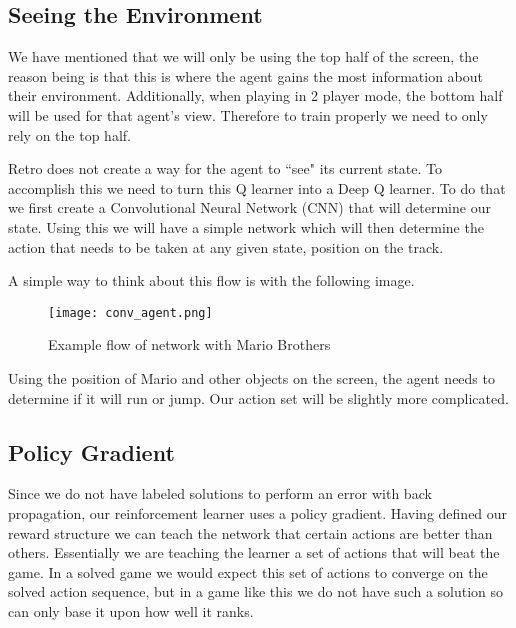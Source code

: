 \subsection{Seeing the Environment}
We have mentioned that we will only be using the top half of the screen, the
reason being is that this is where the agent gains the most information about
their environment. Additionally, when playing in 2 player mode, the bottom half
will be used for that agent's view. Therefore to train properly we need to only
rely on the top half. 

Retro does not create a way for the agent to ``see" its current state. To 
accomplish this we need to turn this Q learner into a Deep Q learner. To do that
we first create a Convolutional Neural Network (CNN) that will determine our
state. Using this we will have a simple network which will then determine the
action that needs to be taken at any given state, position on the track. 

A simple way to think about this flow is with the following image.
\begin{figure}[h]
    \centering
    \texttt{[image: conv\_agent.png]}
    \caption{Example flow of network with Mario Brothers}
\end{figure}
Using the position of Mario and other objects on the screen, the agent needs
to determine if it will run or jump. Our action set will be slightly more
complicated. 

\subsection{Policy Gradient}
Since we do not have labeled solutions to perform an error with back propagation,
our reinforcement learner uses a policy gradient. Having defined our reward 
structure we can teach the network that certain actions are better than others.
Essentially we are teaching the learner a set of actions that will beat the game.
In a solved game we would expect this set of actions to converge on the solved
action sequence, but in a game like this we do not have such a solution so can
only base it upon how well it ranks. 
